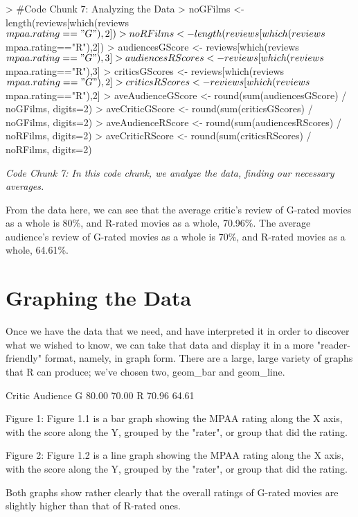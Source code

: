 \documentclass{article}
\begin{document}
\begin{Schunk}
\begin{Sinput}
> #Code Chunk 7: Analyzing the Data
> noGFilms <- length(reviews[which(reviews$mpaa.rating=="G"),2])
> noRFilms <- length(reviews[which(reviews$mpaa.rating=="R"),2])
> audiencesGScore <- reviews[which(reviews$mpaa.rating=="G"),3]
> audiencesRScores <- reviews[which(reviews$mpaa.rating=="R"),3]
> criticsGScores <- reviews[which(reviews$mpaa.rating=="G"),2]
> criticsRScores <- reviews[which(reviews$mpaa.rating=="R"),2]
> aveAudienceGScore <- round(sum(audiencesGScore) / noGFilms, digits=2)
> aveCriticGScore <- round(sum(criticsGScores) / noGFilms, digits=2)
> aveAudienceRScore <- round(sum(audiencesRScores) / noRFilms, digits=2)
> aveCriticRScore <- round(sum(criticsRScores) / noRFilms, digits=2)
\end{Sinput}
\end{Schunk}
\emph{Code Chunk 7: In this code chunk, we analyze the data, finding our necessary averages.}

From the data here, we can see that the average critic's review of G-rated movies as a whole is 80\%, and R-rated movies as a whole, 70.96\%. The average audience's review of G-rated movies as a whole is 70\%, and R-rated movies as a whole, 64.61\%. 

\section*{Graphing the Data}
Once we have the data that we need, and have interpreted it in order to discover what we wished to know, we can take that data and display it in a more "reader-friendly" format, namely, in graph form. There are a large, large variety of graphs that R can produce; we've chosen two, geom_bar and geom_line. 


\begin{Schunk}
\begin{Soutput}
  Critic Audience
G  80.00    70.00
R  70.96    64.61
\end{Soutput}
\end{Schunk}

Figure 1: Figure 1.1 is a bar graph showing the MPAA rating along the X axis, with the score along the Y, grouped by the "rater", or group that did the rating.

Figure 2: Figure 1.2 is a line graph showing the MPAA rating along the X axis, with the score along the Y, grouped by the "rater", or group that did the rating.

Both graphs show rather clearly that the overall ratings of G-rated movies are slightly higher than that of R-rated ones. 
\end{document}
